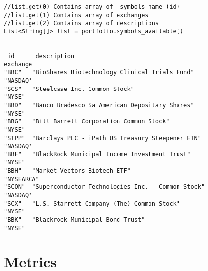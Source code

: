 \documentclass[letterpaper]{report}
\newcounter{N}
\begin{document}
\begin{lstlisting}
//list.get(0) Contains array of  symbols name (id)
//list.get(1) Contains array of exchanges 
//list.get(2) Contains array of descriptions
List<String[]> list = portfolio.symbols_available()


 id      description                                                 exchange  
"BBC"   "BioShares Biotechnology Clinical Trials Fund"              "NASDAQ"  
"SCS"   "Steelcase Inc. Common Stock"                               "NYSE"    
"BBD"   "Banco Bradesco Sa American Depositary Shares"              "NYSE"    
"BBG"   "Bill Barrett Corporation Common Stock"                     "NYSE"    
"STPP"  "Barclays PLC - iPath US Treasury Steepener ETN"            "NASDAQ"  
"BBF"   "BlackRock Municipal Income Investment Trust"               "NYSE"      
"BBH"   "Market Vectors Biotech ETF"                                "NYSEARCA"
"SCON"  "Superconductor Technologies Inc. - Common Stock"           "NASDAQ"  
"SCX"   "L.S. Starrett Company (The) Common Stock"                  "NYSE"    
"BBK"   "Blackrock Municipal Bond Trust"                            "NYSE"  
\end{lstlisting}

\chapter{Metrics}
\end{document}

